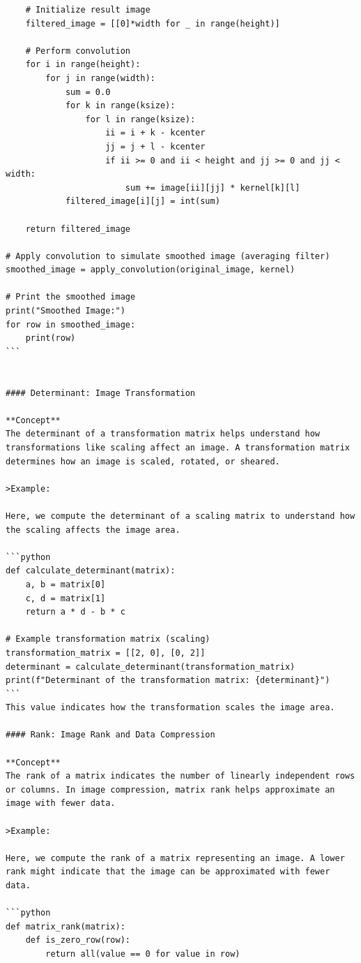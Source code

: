 \documentclass[
  letterpaper,
  DIV=11,
  numbers=noendperiod]{scrreprt}
\theoremstyle{plain}
\theoremstyle{definition}
\theoremstyle{remark}
\begin{document}
\begin{verbatim}
    # Initialize result image
    filtered_image = [[0]*width for _ in range(height)]

    # Perform convolution
    for i in range(height):
        for j in range(width):
            sum = 0.0
            for k in range(ksize):
                for l in range(ksize):
                    ii = i + k - kcenter
                    jj = j + l - kcenter
                    if ii >= 0 and ii < height and jj >= 0 and jj < width:
                        sum += image[ii][jj] * kernel[k][l]
            filtered_image[i][j] = int(sum)
    
    return filtered_image

# Apply convolution to simulate smoothed image (averaging filter)
smoothed_image = apply_convolution(original_image, kernel)

# Print the smoothed image
print("Smoothed Image:")
for row in smoothed_image:
    print(row)
```


#### Determinant: Image Transformation

**Concept**
The determinant of a transformation matrix helps understand how transformations like scaling affect an image. A transformation matrix determines how an image is scaled, rotated, or sheared.

>Example:

Here, we compute the determinant of a scaling matrix to understand how the scaling affects the image area.

```python
def calculate_determinant(matrix):
    a, b = matrix[0]
    c, d = matrix[1]
    return a * d - b * c

# Example transformation matrix (scaling)
transformation_matrix = [[2, 0], [0, 2]]
determinant = calculate_determinant(transformation_matrix)
print(f"Determinant of the transformation matrix: {determinant}")
```
This value indicates how the transformation scales the image area.

#### Rank: Image Rank and Data Compression

**Concept**
The rank of a matrix indicates the number of linearly independent rows or columns. In image compression, matrix rank helps approximate an image with fewer data.

>Example:

Here, we compute the rank of a matrix representing an image. A lower rank might indicate that the image can be approximated with fewer data.

```python
def matrix_rank(matrix):
    def is_zero_row(row):
        return all(value == 0 for value in row)


\end{verbatim}
\end{document}
